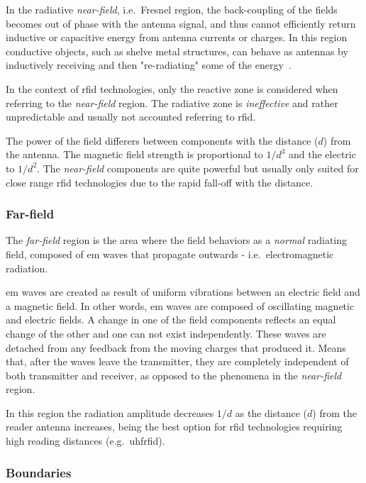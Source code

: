 In the radiative \emph{near-field}, i.e.\ Fresnel region, the back-coupling of the fields becomes out of phase with the antenna signal, and thus cannot efficiently return inductive or capacitive energy from antenna currents or charges.
In this region conductive objects, such as shelve metal structures, can behave as antennas by inductively receiving and then "re-radiating" some of the energy~\cite{ElectromagneticRadiationField}.

In the context of \ac{rfid} technologies, only the reactive zone is considered when referring to the \emph{near-field} region. The radiative zone is \textit{ineffective} and rather unpredictable and usually not accounted referring to \ac{rfid}.

The power of the field differers between components with the distance ($d$) from the antenna. The magnetic field strength is proportional to $1/d^3$ and the electric to $1/d^2$. The \emph{near-field} components are quite powerful but usually only suited for close range \ac{rfid} technologies due to the rapid fall-off with the distance.

\subsubsection{Far-field}

The \emph{far-field} region is the area where the field behaviors as a \textit{normal} radiating field, composed of \ac{em} waves that propagate outwards - i.e.\ electromagnetic radiation.

\ac{em} waves are created as result of uniform vibrations between an electric field and a magnetic field. In other words, \ac{em} waves are composed of oscillating magnetic and electric fields. A change in one of the field components reflects an equal change of the other and one can not exist independently.
These waves are detached from any feedback from the moving charges that produced it. Means that, after the waves leave the transmitter, they are completely independent of both transmitter and receiver, as opposed to the phenomena in the \emph{near-field} region.

In this region the radiation amplitude decreases $1/d$ as the distance ($d$) from the reader antenna increases, being the best option for \ac{rfid} technologies requiring high reading distances (e.g.\ \ac{uhfrfid}).

\subsubsection{Boundaries}

